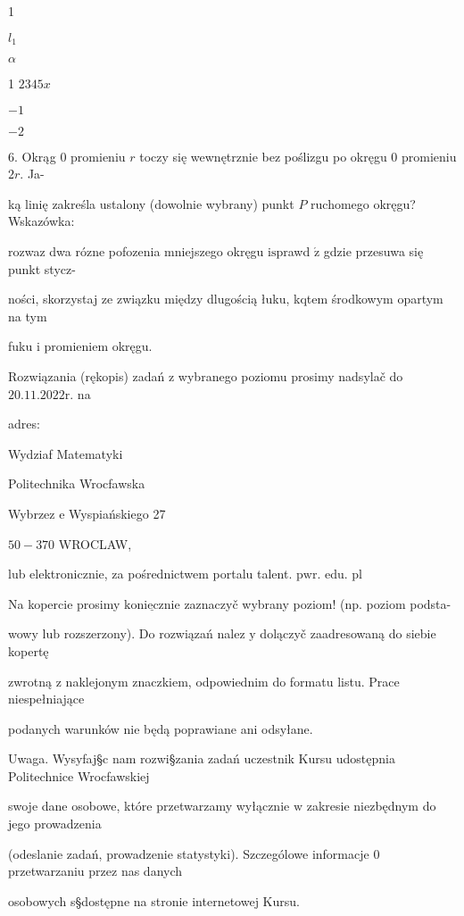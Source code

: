 \documentclass[a4paper,12pt]{article}
\begin{document}
1

$l_{1}$

$\alpha$

1 $2 3 4 5 x$

$-1$

$-2$

6. Okrąg $0$ promieniu $r$ toczy się wewnętrznie bez poślizgu po okręgu $0$ promieniu $2r$. Ja-

ką linię zakreśla ustalony (dowolnie wybrany) punkt $P$ ruchomego okręgu? Wskazówka:

rozwaz dwa rózne pofozenia mniejszego okręgu $\mathrm{i}\mathrm{s}$prawd $\acute{\mathrm{z}}$ gdzie przesuwa się punkt stycz-

ności, skorzystaj ze związku między dlugością łuku, kqtem środkowym opartym na tym

fuku $\mathrm{i}$ promieniem okręgu.

Rozwiązania (rękopis) zadań $\mathrm{z}$ wybranego poziomu prosimy nadsylač do $20.11.2022\mathrm{r}$. na

adres:

Wydziaf Matematyki

Politechnika Wrocfawska

Wybrzez $\mathrm{e}$ Wyspiańskiego 27

$50-370$ WROCLAW,

lub elektronicznie, za pośrednictwem portalu talent. $\mathrm{p}\mathrm{w}\mathrm{r}$. edu. pl

Na kopercie prosimy $\underline{\mathrm{k}\mathrm{o}\mathrm{n}\mathrm{i}\mathrm{e}\mathrm{c}\mathrm{z}\mathrm{n}\mathrm{i}\mathrm{e}}$ zaznaczyč wybrany poziom! (np. poziom podsta-

wowy $\mathrm{l}\mathrm{u}\mathrm{b}$ rozszerzony). Do rozwiązań nalez $\mathrm{y}$ dolączyč zaadresowaną do siebie kopertę

zwrotną $\mathrm{z}$ naklejonym znaczkiem, odpowiednim do formatu listu. Prace niespełniające

podanych warunków nie będą poprawiane ani odsyłane.

Uwaga. Wysyfaj\S c nam rozwi\S zania zadań uczestnik Kursu udostępnia Politechnice Wrocfawskiej

swoje dane osobowe, które przetwarzamy wyłącznie $\mathrm{w}$ zakresie niezbędnym do jego prowadzenia

(odeslanie zadań, prowadzenie statystyki). Szczególowe informacje $0$ przetwarzaniu przez nas danych

osobowych s\S dostępne na stronie internetowej Kursu.
\end{document}
